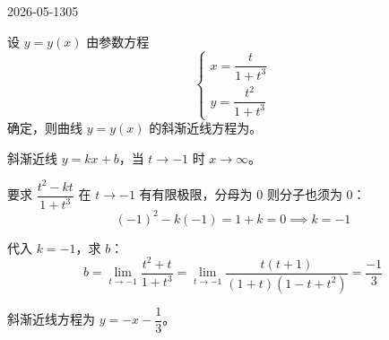 \begin{mistake}{2026-05-13}{05}

\begin{problemcontent}
设 \(y=y(x)\) 由参数方程
\[
\begin{cases} x = \dfrac{t}{1+t^3} \\[6pt] y = \dfrac{t^2}{1+t^3} \end{cases}
\]
确定，则曲线 \(y=y(x)\) 的斜渐近线方程为\underline{\hspace{3cm}}。
\end{problemcontent}

\begin{solutioncontent}
斜渐近线 \(y = kx + b\)，当 \(t \to -1\) 时 \(x \to \infty\)。

要求 \(\dfrac{t^2 - kt}{1+t^3}\) 在 \(t \to -1\) 有有限极限，分母为 0 则分子也须为 0：
\[
(-1)^2 - k(-1) = 1 + k = 0 \implies k = -1
\]

代入 \(k=-1\)，求 \(b\)：
\[
b = \lim_{t \to -1}\frac{t^2 + t}{1+t^3} = \lim_{t \to -1}\frac{t(t+1)}{(1+t)(1-t+t^2)} = \frac{-1}{3}
\]

斜渐近线方程为 \(y = -x - \dfrac{1}{3}\)。
\end{solutioncontent}


\end{mistake}

